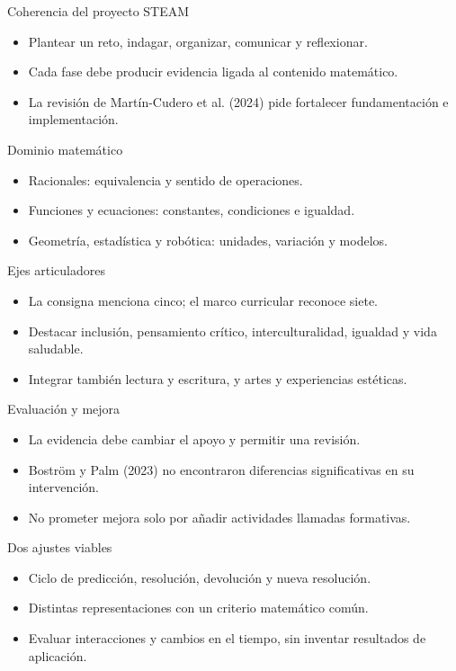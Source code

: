 \documentclass[
	spanish,
	aspectratio=1610,
	xcolor={dvipsnames,table}
]{beamer}
\begin{document}
\begin{frame}{Coherencia del proyecto STEAM}
\fontsize{14}{18}\selectfont\begin{itemize}\setlength{\itemsep}{.45cm}
\item Plantear un reto, indagar, organizar, comunicar y reflexionar.
\item Cada fase debe producir evidencia ligada al contenido matemático.
\item La revisión de Martín-Cudero et al. (2024) pide fortalecer fundamentación e implementación.
\end{itemize}
\end{frame}
\begin{frame}{Dominio matemático}
\fontsize{14}{18}\selectfont\begin{itemize}\setlength{\itemsep}{.45cm}
\item Racionales: equivalencia y sentido de operaciones.
\item Funciones y ecuaciones: constantes, condiciones e igualdad.
\item Geometría, estadística y robótica: unidades, variación y modelos.
\end{itemize}
\end{frame}
\begin{frame}{Ejes articuladores}
\fontsize{14}{18}\selectfont\begin{itemize}\setlength{\itemsep}{.45cm}
\item La consigna menciona cinco; el marco curricular reconoce siete.
\item Destacar inclusión, pensamiento crítico, interculturalidad, igualdad y vida saludable.
\item Integrar también lectura y escritura, y artes y experiencias estéticas.
\end{itemize}
\end{frame}
\begin{frame}{Evaluación y mejora}
\fontsize{14}{18}\selectfont\begin{itemize}\setlength{\itemsep}{.45cm}
\item La evidencia debe cambiar el apoyo y permitir una revisión.
\item Boström y Palm (2023) no encontraron diferencias significativas en su intervención.
\item No prometer mejora solo por añadir actividades llamadas formativas.
\end{itemize}
\end{frame}
\begin{frame}{Dos ajustes viables}
\fontsize{14}{18}\selectfont\begin{itemize}\setlength{\itemsep}{.45cm}
\item Ciclo de predicción, resolución, devolución y nueva resolución.
\item Distintas representaciones con un criterio matemático común.
\item Evaluar interacciones y cambios en el tiempo, sin inventar resultados de aplicación.
\end{itemize}
\end{frame}
\end{document}
